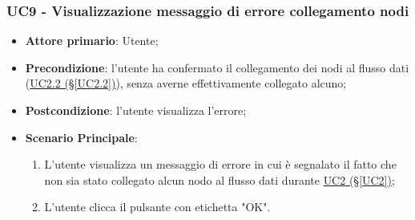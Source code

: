 \pagebreak

\subsubsection{UC9 - Visualizzazione messaggio di errore collegamento nodi}\label{UC9}
\begin{itemize}
\item \textbf{Attore primario}: Utente;
\item \textbf{Precondizione}: l'utente ha confermato il collegamento dei nodi al flusso dati (\hyperref[UC2.2]{UC2.2 (§\ref*{UC2.2})}), senza averne effettivamente collegato alcuno;
\item \textbf{Postcondizione}: l'utente visualizza l'errore;
\item \textbf{Scenario Principale}: 
	\begin{enumerate}
	\item L'utente visualizza un messaggio di errore in cui è segnalato il fatto che non sia stato collegato alcun 				nodo al flusso dati durante \hyperref[UC2]{UC2 (§\ref*{UC2})};
	\item L'utente clicca il pulsante con etichetta "OK".
	\end{enumerate}
\end{itemize}

